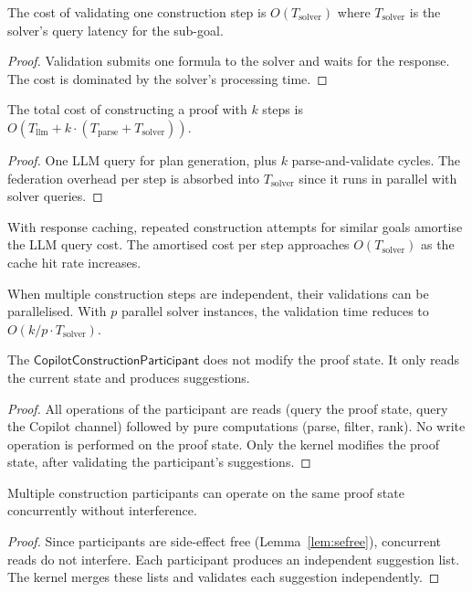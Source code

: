 \documentclass[11pt]{article}
\newcommand{\CCP}{\mathsf{CopilotConstructionParticipant}}
\begin{document}
\begin{lemma}%
\label{lem:valcost}
The cost of validating one construction step is
$O(T_{\mathrm{solver}})$ where $T_{\mathrm{solver}}$ is the
solver's query latency for the sub-goal.
\end{lemma}
\begin{proof}
Validation submits one formula to the solver and waits for
the response.  The cost is dominated by the solver's
processing time.
\end{proof}

\begin{proposition}%
\label{prop:totalcost}
The total cost of constructing a proof with $k$ steps is
$O(T_{\mathrm{llm}} + k \cdot (T_{\mathrm{parse}} + T_{\mathrm{solver}}))$.
\end{proposition}
\begin{proof}
One LLM query for plan generation, plus $k$ parse-and-validate
cycles.  The federation overhead per step is absorbed into
$T_{\mathrm{solver}}$ since it runs in parallel with solver
queries.
\end{proof}

\begin{remark}
With response caching, repeated construction attempts for
similar goals amortise the LLM query cost.  The amortised
cost per step approaches $O(T_{\mathrm{solver}})$ as the
cache hit rate increases.
\end{remark}

\begin{remark}
When multiple construction steps are independent, their
validations can be parallelised.  With $p$ parallel solver
instances, the validation time reduces to
$O(k/p \cdot T_{\mathrm{solver}})$.
\end{remark}

\begin{lemma}%
\label{lem:sefree}
The $\CCP$ does not modify the proof state.  It only reads
the current state and produces suggestions.
\end{lemma}
\begin{proof}
All operations of the participant are reads (query the proof
state, query the Copilot channel) followed by pure computations
(parse, filter, rank).  No write operation is performed on
the proof state.  Only the kernel modifies the proof state,
after validating the participant's suggestions.
\end{proof}

\begin{lemma}%
\label{lem:multipart}
Multiple construction participants can operate on the same
proof state concurrently without interference.
\end{lemma}
\begin{proof}
Since participants are side-effect free
(Lemma~\ref{lem:sefree}), concurrent reads do not
interfere.  Each participant produces an independent
suggestion list.  The kernel merges these lists and
validates each suggestion independently.
\end{proof}
\end{document}

